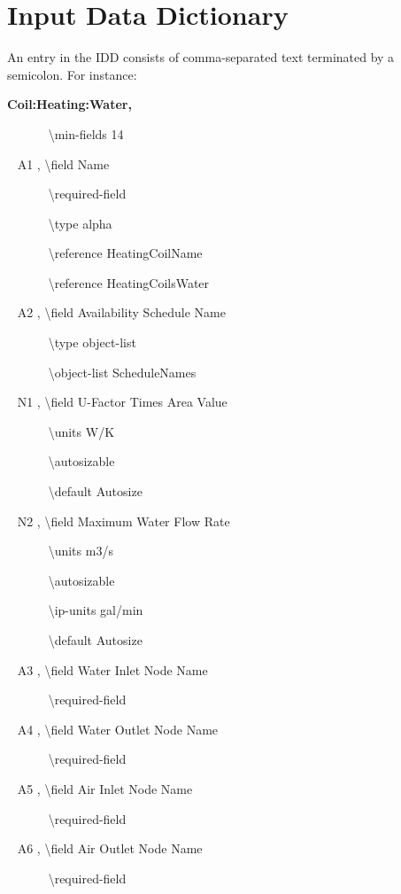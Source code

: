 \section{Input Data Dictionary}\label{input-data-dictionary}

An entry in the IDD consists of comma-separated text terminated by a semicolon. For instance:

\textbf{Coil:Heating:Water,}

~~~~~~ \textbackslash{}min-fields 14

~ A1 , \textbackslash{}field Name

~~~~~~ \textbackslash{}required-field

~~~~~~ \textbackslash{}type alpha

~~~~~~ \textbackslash{}reference HeatingCoilName

~~~~~~ \textbackslash{}reference HeatingCoilsWater

~ A2 , \textbackslash{}field Availability Schedule Name

~~~~~~ \textbackslash{}type object-list

~~~~~~ \textbackslash{}object-list ScheduleNames

~ N1 , \textbackslash{}field U-Factor Times Area Value

~~~~~~ \textbackslash{}units W/K

~~~~~~ \textbackslash{}autosizable

~~~~~~ \textbackslash{}default Autosize

~ N2 , \textbackslash{}field Maximum Water Flow Rate

~~~~~~ \textbackslash{}units m3/s

~~~~~~ \textbackslash{}autosizable

~~~~~~ \textbackslash{}ip-units gal/min

~~~~~~ \textbackslash{}default Autosize

~ A3 , \textbackslash{}field Water Inlet Node Name

~~~~~~ \textbackslash{}required-field

~ A4 , \textbackslash{}field Water Outlet Node Name

~~~~~~ \textbackslash{}required-field

~ A5 , \textbackslash{}field Air Inlet Node Name

~~~~~~ \textbackslash{}required-field

~ A6 , \textbackslash{}field Air Outlet Node Name

~~~~~~ \textbackslash{}required-field

